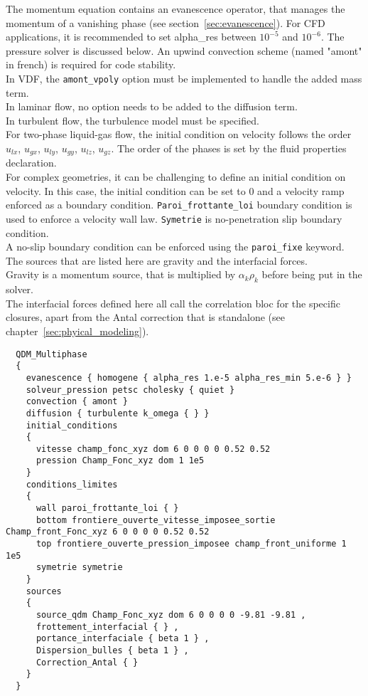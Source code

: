 The momentum equation contains an evanescence operator, that manages the momentum of a vanishing phase (see section~\ref{sec:evanescence}). For CFD applications, it is recommended to set alpha\_res between $10^{-5}$ and $10^{-6}$. The pressure solver is discussed below. An upwind convection scheme (named "amont" in french) is required for code stability.\\
In VDF, the \texttt{amont\_vpoly} option must be implemented to handle the added mass term.\\
In laminar flow, no option needs to be added to the diffusion term.\\
In turbulent flow, the turbulence model must be specified.\\
For two-phase liquid-gas flow, the initial condition on velocity follows the order $u_{lx}$, $u_{gx}$, $u_{ly}$, $u_{gy}$, $u_{lz}$, $u_{gz}$. The order of the phases is set by the fluid properties declaration.\\
For complex geometries, it can be challenging to define an initial condition on velocity. In this case, the initial condition can be set to 0 and a velocity ramp enforced as a boundary condition. \texttt{Paroi\_frottante\_loi} boundary condition is used to enforce a velocity wall law. \texttt{Symetrie} is no-penetration slip boundary condition.\\
A no-slip boundary condition can be enforced using the \texttt{paroi\_fixe} keyword. The sources that are listed here are gravity and the interfacial forces. \\
Gravity is a momentum source, that is multiplied by $\alpha_k \rho_k$ before being put in the solver.\\
The interfacial forces defined here all call the correlation bloc for the specific closures, apart from the Antal correction that is standalone (see chapter~\ref{sec:phyical_modeling}).

\begin{lstlisting}
  QDM_Multiphase
  {
    evanescence { homogene { alpha_res 1.e-5 alpha_res_min 5.e-6 } }
    solveur_pression petsc cholesky { quiet }
    convection { amont }
    diffusion { turbulente k_omega { } }
    initial_conditions
    {
      vitesse champ_fonc_xyz dom 6 0 0 0 0 0.52 0.52
      pression Champ_Fonc_xyz dom 1 1e5
    }
    conditions_limites
    {
      wall paroi_frottante_loi { }
      bottom frontiere_ouverte_vitesse_imposee_sortie Champ_front_Fonc_xyz 6 0 0 0 0 0.52 0.52
      top frontiere_ouverte_pression_imposee champ_front_uniforme 1 1e5
      symetrie symetrie
    }
    sources
    {
      source_qdm Champ_Fonc_xyz dom 6 0 0 0 0 -9.81 -9.81 ,
      frottement_interfacial { } ,
      portance_interfaciale { beta 1 } ,
      Dispersion_bulles { beta 1 } ,
      Correction_Antal { }
    }
  }
\end{lstlisting}

